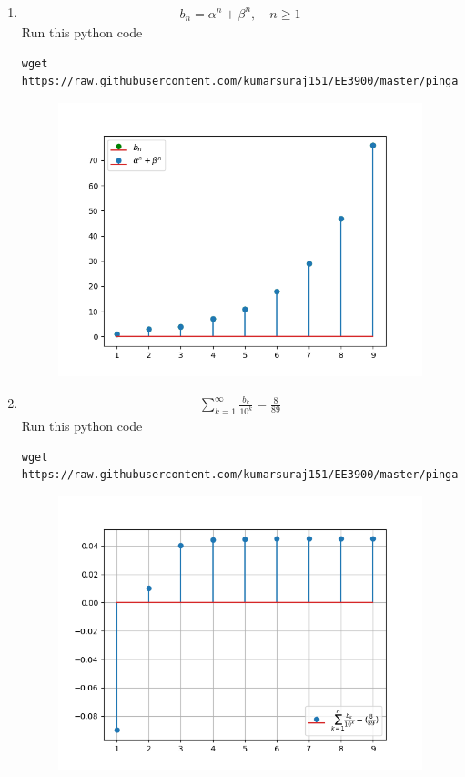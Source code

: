 \documentclass[journal,12pt,twocolumn]{IEEEtran}
\renewcommand\thesection{\arabic{section}}
\begin{document}
\begin{enumerate}[label=\thesection.\arabic*
,ref=\thesection.\theenumi]
\begin{figure}[h]
	\caption{}
\end{figure}
 \item 
\begin{align}
	b_n =\alpha^n + \beta^n, \quad n \ge 1
\end{align}
\solution  Run this python code 
\begin{lstlisting}
wget https://raw.githubusercontent.com/kumarsuraj151/EE3900/master/pingala/codes/1_1.py
\end{lstlisting}
\begin{figure}[h]
	\centering
	\includegraphics[width=0.7\columnwidth]{./figs/1_3.png}
	\caption{}
\end{figure}
 \item 
\begin{align}
	\sum_{k=1}^{\infty}\frac{b_k}{10^k} =\frac{8}{89}
\end{align}
\solution  Run this python code 
\begin{lstlisting}
wget https://raw.githubusercontent.com/kumarsuraj151/EE3900/master/pingala/codes/1_1.py
\end{lstlisting}
\begin{figure}[h]
	\centering
	\includegraphics[width=0.7\columnwidth]{./figs/1_4.png}
	\caption{}
\end{figure}
\end{enumerate}
\end{document}

